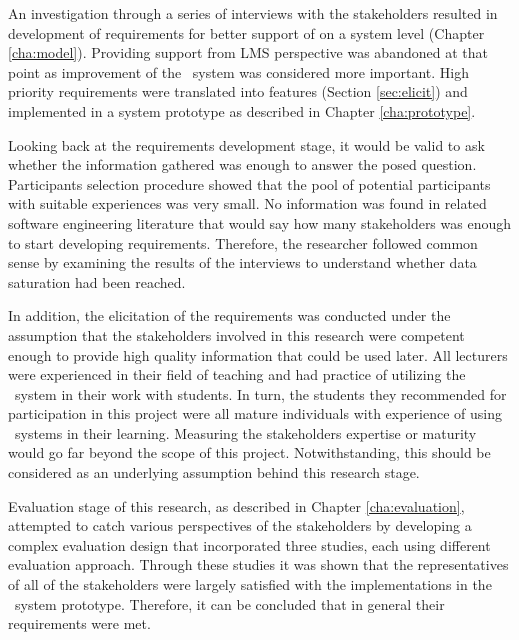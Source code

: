 
An investigation through a series of interviews with the stakeholders resulted
in development of requirements for better support of \LLLs on a system level
(Chapter \ref{cha:model}). Providing support from LMS perspective was abandoned
at that point as improvement of the \ep~system was considered more important.
High priority requirements were translated into features (Section
\ref{sec:elicit}) and implemented in a system prototype as described in Chapter
\ref{cha:prototype}.

Looking back at the requirements development stage, it would be valid to ask
whether the information gathered was enough to answer the posed question.
Participants selection procedure showed that the pool of potential participants
with suitable experiences was very small. No information was found in related
software engineering literature that would say how many stakeholders was enough
to start developing requirements. Therefore, the researcher followed common
sense by examining the results of the interviews to understand whether data
saturation had been reached.

In addition, the elicitation of the requirements was conducted under the
assumption that the stakeholders involved in this research were competent enough
to provide high quality information that could be used later. All lecturers were
experienced in their field of teaching and had practice of utilizing the
\ep~system in their work with students. In turn, the students they recommended
for participation in this project were all mature individuals with experience of
using \ep~systems in their learning. Measuring the stakeholders expertise or
maturity would go far beyond the scope of this project. Notwithstanding, this
should be considered as an underlying assumption behind this research stage.


Evaluation stage of this research, as described in Chapter \ref{cha:evaluation},
attempted to catch various perspectives of the stakeholders by developing a
complex evaluation design that incorporated three studies, each using different
evaluation approach. Through these studies it was shown that the representatives
of all of the stakeholders were largely satisfied with the implementations in
the \ep~system prototype. Therefore, it can be concluded that in general their
requirements were met.

